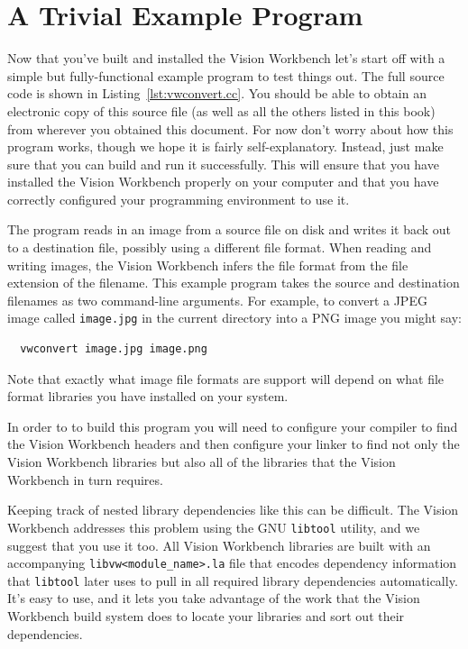 \section{A Trivial Example Program}

Now that you've built and installed the Vision Workbench let's start
off with a simple but fully-functional example program to test things
out.  The full source code is shown in Listing~\ref{lst:vwconvert.cc}.
You should be able to obtain an electronic copy of this source file
(as well as all the others listed in this book) from wherever you
obtained this document.  For now don't worry about how this program
works, though we hope it is fairly self-explanatory.  Instead, just
make sure that you can build and run it successfully.  This will
ensure that you have installed the Vision Workbench properly on your
computer and that you have correctly configured your programming
environment to use it.


The program reads in an image from a source file on disk and writes it
back out to a destination file, possibly using a different file
format.  When reading and writing images, the Vision Workbench infers
the file format from the file extension of the filename.  This example
program takes the source and destination filenames as two command-line
arguments.  For example, to convert a JPEG image called
\verb#image.jpg# in the current directory into a PNG image you might
say:
\begin{verbatim}
  vwconvert image.jpg image.png
\end{verbatim}
Note that exactly what image file formats are support will depend on
what file format libraries you have installed on your system.

In order to to build this program you will need to configure your
compiler to find the Vision Workbench headers and then configure your
linker to find not only the Vision Workbench libraries but also all of
the libraries that the Vision Workbench in turn requires.  

Keeping track of nested library dependencies like this can be
difficult.  The Vision Workbench addresses this problem using the GNU
\verb#libtool# utility, and we suggest that you use it too.  All
Vision Workbench libraries are built with an accompanying
\verb#libvw<module_name>.la# file that encodes dependency information that
\verb#libtool# later uses to pull in all required library dependencies
automatically.  It's easy to use, and it lets you take advantage of
the work that the Vision Workbench build system does to locate your
libraries and sort out their dependencies.

